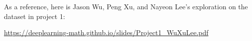 \documentclass[11pt]{article}
\begin{document}
As a reference, here is Jason Wu, Peng Xu, and Nayeon Lee's exploration on the dataset in project 1:

\url{https://deeplearning-math.github.io/slides/Project1_WuXuLee.pdf}


%
%
%
%
%
%
%
\end{document}
